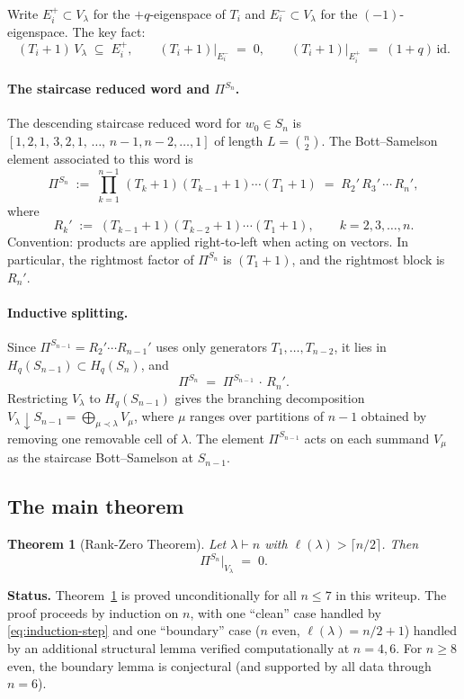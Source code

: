 \documentclass[11pt]{article}
\newtheorem{theorem}{Theorem}
\theoremstyle{definition}
\begin{document}
Write $E_i^+ \subset V_\lambda$ for the $+q$-eigenspace of $T_i$ and
$E_i^- \subset V_\lambda$ for the $(-1)$-eigenspace. The key fact:
\[
  (T_i+1)\,V_\lambda \;\subseteq\; E_i^+,
  \qquad
  (T_i+1)\!\big|_{E_i^-} \;=\; 0,
  \qquad
  (T_i+1)\!\big|_{E_i^+} \;=\; (1+q)\,\mathrm{id}.
\]

\paragraph{The staircase reduced word and $\Pi^{S_n}$.}
The descending staircase reduced word for $w_0\in S_n$ is
$[1,2,1,\,3,2,1,\,\ldots,\,n{-}1,n{-}2,\ldots,1]$ of length
$L=\binom{n}{2}$. The Bott--Samelson element associated to this word
is
\[
  \Pi^{S_n} \;:=\; \prod_{k=1}^{n-1}\,(T_k+1)(T_{k-1}+1)\cdots(T_1+1)
              \;=\; R_2'\,R_3'\,\cdots\,R_n',
\]
where
\[
  R_k' \;:=\; (T_{k-1}{+}1)(T_{k-2}{+}1)\cdots(T_1{+}1),
  \qquad k=2,3,\ldots,n.
\]
Convention: products are applied right-to-left when acting on
vectors. In particular, the rightmost factor of $\Pi^{S_n}$ is
$(T_1{+}1)$, and the rightmost block is $R_n'$.

\paragraph{Inductive splitting.}
Since $\Pi^{S_{n-1}} = R_2'\cdots R_{n-1}'$ uses only generators
$T_1,\ldots,T_{n-2}$, it lies in $H_q(S_{n-1})\subset H_q(S_n)$, and
\begin{equation}\label{eq:induction-step}
  \Pi^{S_n} \;=\; \Pi^{S_{n-1}}\,\cdot\,R_n'.
\end{equation}
Restricting $V_\lambda$ to $H_q(S_{n-1})$ gives the branching
decomposition $V_\lambda{\downarrow}\!S_{n-1} = \bigoplus_{\mu\prec\lambda}V_\mu$,
where $\mu$ ranges over partitions of $n{-}1$ obtained by removing one
removable cell of $\lambda$. The element $\Pi^{S_{n-1}}$ acts on
each summand $V_\mu$ as the staircase Bott--Samelson at $S_{n-1}$.

\subsection{The main theorem}

\begin{theorem}[Rank-Zero Theorem]\label{thm:rank-zero}
Let $\lambda\vdash n$ with $\ell(\lambda)>\lceil n/2\rceil$. Then
\[
   \Pi^{S_n}\!\big|_{V_\lambda} \;=\; 0.
\]
\end{theorem}

\noindent\textbf{Status.} Theorem~\ref{thm:rank-zero} is proved
unconditionally for all $n\le 7$ in this writeup. The proof
proceeds by induction on $n$, with one ``clean'' case handled by
\eqref{eq:induction-step} and one ``boundary'' case
($n$ even, $\ell(\lambda)=n/2+1$) handled by an additional
structural lemma verified computationally at $n=4,6$. For $n\ge 8$
even, the boundary lemma is conjectural (and supported by all
data through $n=6$).
\end{document}
